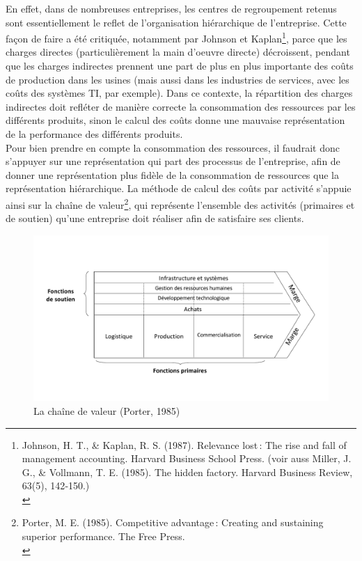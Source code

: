 \documentclass{tufte-handout}
\begin{document}
\begin{enumerate}
En effet, dans de nombreuses entreprises, les centres de regroupement retenus sont essentiellement le reflet de l'organisation hiérarchique de l'entreprise. Cette façon de faire a été critiquée, notamment par Johnson et Kaplan\footnote{Johnson, H. T., \& Kaplan, R. S. (1987). Relevance lost : The rise and fall of management accounting. Harvard Business School Press. (voir auss Miller, J. G., \& Vollmann, T. E. (1985). The hidden factory. Harvard Business Review, 63(5), 142‑150.)\\}, parce que les charges directes (particulièrement la main d'oeuvre directe) décroissent, pendant que les charges indirectes prennent une part de plus en plus importante des coûts de production dans les usines (mais aussi dans les industries de services, avec les coûts des systèmes TI, par exemple). Dans ce contexte, la répartition des charges indirectes doit refléter de manière correcte la consommation des ressources par les différents produits, sinon le calcul des coûts donne une mauvaise représentation de la performance des différents produits.\\

Pour bien prendre en compte la consommation des ressources, il faudrait donc s'appuyer sur une représentation qui part des processus de l'entreprise, afin de donner une représentation plus fidèle de la consommation de ressources que la représentation hiérarchique. La méthode de calcul des coûts par activité s'appuie ainsi sur la chaîne de valeur\footnote{Porter, M. E. (1985). Competitive advantage : Creating and sustaining superior performance. The Free Press.\\}, qui représente l'ensemble des activités (primaires et de soutien) qu'une entreprise doit réaliser afin de satisfaire ses clients.\\

\begin{figure}[htbp]
\centering
\includegraphics[width=.9\linewidth]{./img/chaine.pdf}
\caption{La chaîne de valeur (Porter, 1985)}
\end{figure}


\end{enumerate}
\end{document}

